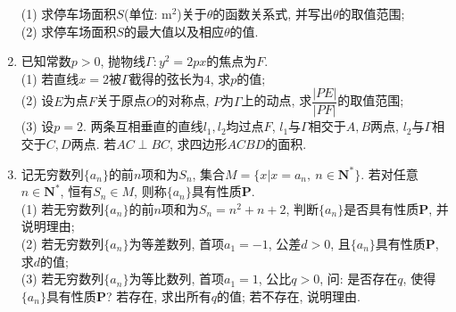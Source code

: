 \documentclass[10pt,a4paper]{article}
\begin{document}
\begin{enumerate}[1.]
\begin{center}
\end{center}
(1) 求停车场面积$S$(单位: $\text{m}^2$)关于$\theta$的函数关系式, 并写出$\theta$的取值范围;\\
(2) 求停车场面积$S$的最大值以及相应$\theta$的值.
\item 已知常数$p>0$, 抛物线$\Gamma:y^2=2px$的焦点为$F$.\\
(1) 若直线$x=2$被$\Gamma$截得的弦长为$4$, 求$p$的值;\\
(2) 设$E$为点$F$关于原点$O$的对称点, $P$为$\Gamma$上的动点, 求$\dfrac{|PE|}{|PF|}$的取值范围;\\
(3) 设$p=2$. 两条互相垂直的直线$l_1,l_2$均过点$F$, $l_1$与$\Gamma$相交于$A,B$两点, $l_2$与$\Gamma$相交于$C,D$两点. 若$AC\perp BC$, 求四边形$ACBD$的面积.
\item 记无穷数列$\{a_n\}$的前$n$项和为$S_n$, 集合$M=\{x|x=a_n, \ n\in \mathbf{N}^*\}$. 若对任意$n\in \mathbf{N}^*$, 恒有$S_n\in M$, 则称$\{a_n\}$具有性质$\mathbf{P}$.\\
(1) 若无穷数列$\{a_n\}$的前$n$项和为$S_n=n^2+n+2$, 判断$\{a_n\}$是否具有性质$\mathbf{P}$, 并说明理由;\\
(2) 若无穷数列$\{a_n\}$为等差数列, 首项$a_1=-1$, 公差$d>0$, 且$\{a_n\}$具有性质$\mathbf{P}$, 求$d$的值;\\
(3) 若无穷数列$\{a_n\}$为等比数列, 首项$a_1=1$, 公比$q>0$, 问: 是否存在$q$, 使得$\{a_n\}$具有性质$\mathbf{P}$? 若存在, 求出所有$q$的值; 若不存在, 说明理由.


\end{enumerate}
\end{document}
